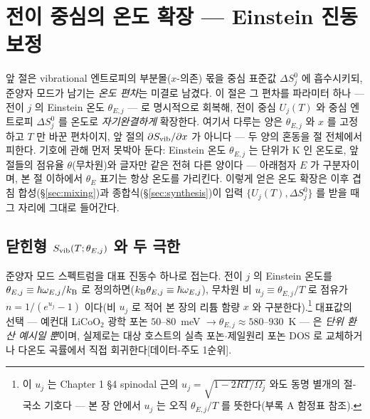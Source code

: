 \section{전이 중심의 온도 확장 --- Einstein 진동 보정}\label{sec:einstein}

앞 절은 vibrational 엔트로피의 부분몰($x$-의존) 몫을 중심 표준값 $\Delta S^0_j$ 에 흡수시키되, 준양자 모드가
남기는 \emph{온도 편차}는 미결로 남겼다. 이 절은 그 편차를 파라미터 하나 --- 전이 $j$ 의 Einstein 온도
$\theta_{E,j}$ --- 로 명시적으로 회복해, 전이 중심 $U_j(T)$ 와 중심 엔트로피 $\Delta S^0_j$ 를 온도로
\emph{자기완결하게} 확장한다. 여기서 다루는 양은 $\theta_{E,j}$ 와 $x$ 를 고정하고 $T$ 만 바꾼 편차이지, 앞
절의 $\partial S_{\mathrm{vib}}/\partial x$ 가 아니다 --- 두 양의 혼동을 절 전체에서 피한다. 기호에 관해 먼저 못박아
둔다: Einstein 온도 $\theta_{E,j}$ 는 단위가 K 인 온도로, 앞 절들의 점유율 $\theta$(무차원)와 글자만 같은
전혀 다른 양이다 --- 아래첨자 $E$ 가 구분자이며, 본 절 이하에서 $\theta_E$ 표기는 항상 온도를 가리킨다.
이렇게 얻은 온도 확장은 이후
겹침 합성(\S\ref{sec:mixing})과 종합식(\S\ref{sec:synthesis})이 입력 $\{U_j(T),\Delta S^0_j\}$ 를 받을 때 그
자리에 그대로 들어간다.

\subsection{닫힌형 $S_{\mathrm{vib}}(T;\theta_{E,j})$ 와 두 극한}\label{ssec:einstein-closed}
준양자 모드 스펙트럼을 대표 진동수 하나로 접는다. 전이 $j$ 의 Einstein 온도를 $\theta_{E,j}\equiv\hbar
\omega_{E,j}/k_{\mathrm B}$ 로 정의하면($k_{\mathrm B}\theta_{E,j}\equiv\hbar\omega_{E,j}$), 무차원 비 $u_j\equiv\theta_{E,j}/T$ 로
점유가 $n=1/(e^{u_j}-1)$ 이다(비 $u_j$ 로 적어 본 장의 리튬 함량 $x$ 와 구분한다).\footnote{이 $u_j$ 는
Chapter 1 \S4 spinodal 근의 $u_j=\sqrt{1-2RT/\Omega_j}$ 와도 동명 별개의 절-국소 기호다 --- 본 장
안에서 $u_j$ 는 오직 $\theta_{E,j}/T$ 를 뜻한다(부록 A 함정표 참조).} 대표값의 선택 --- 예컨대
LiCoO$_2$ 광학 포논 $50$--$80$~meV $\to\theta_{E,j}\approx580$--$930$~K --- 은 \emph{단위 환산 예시일 뿐}이며,
실제로는 대상 호스트의 실측 포논$\cdot$제일원리 포논 DOS \cite{jpcc2021} 로 교체하거나 다온도 곡률에서 직접
회귀한다[데이터-주도 1순위].

